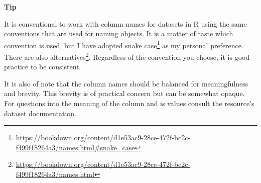 \documentclass[
  letterpaper,
]{latex/krantz}
\DeclareRobustCommand{\href}[2]{#2\footnote{\url{#1}}}
\begin{document}
\begin{tcolorbox}[enhanced jigsaw, arc=.35mm, leftrule=.75mm, rightrule=.15mm, opacityback=0, colback=white, breakable, bottomrule=.15mm, left=2mm, toprule=.15mm]

\textbf{ Tip}

It is conventional to work with column names for datasets in R using the
same conventions that are used for naming objects. It is a matter of
taste which convention is used, but I have adopted
\href{https://bookdown.org/content/d1e53ac9-28ce-472f-bc2c-f499f18264a3/names.html\#snake_case}{snake
case} as my personal preference. There are also
\href{https://bookdown.org/content/d1e53ac9-28ce-472f-bc2c-f499f18264a3/names.html}{alternatives}.
Regardless of the convention you choose, it is good practice to be
consistent.

It is also of note that the column names should be balanced for
meaningfulness and brevity. This brevity is of practical concern but can
be somewhat opaque. For questions into the meaning of the column and is
values consult the resource's dataset documentation.

\end{tcolorbox}
\end{document}
